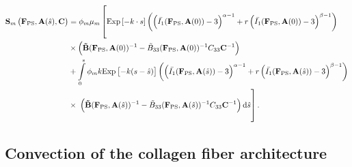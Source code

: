 \begin{equation}
\begin{split}
\mathbf{S}_m \left(\mathbf{F}_\mathrm{PS}, \mathbf{A}(\hat{s}),\mathbf{C}\right) &= \phi_m \mu_m \left[ \vphantom{\int\displaylimits_0^s} \mathrm{Exp}\left[-k  \cdot s\right]  \left(\left( \bar{I_1} (\mathbf{F}_\mathrm{PS}, \mathbf{A}(0)) - 3\right)^{\alpha - 1} + r \left( \bar{I_1} (\mathbf{F}_\mathrm{PS}, \mathbf{A}(0)) - 3\right)^{\beta - 1}\right)  \right.\\
&\times \left( \mathbf{\tilde{B}}(\mathbf{F}_\mathrm{PS}, \mathbf{A}(0))^{-1} - \tilde{B}_{33}(\mathbf{F}_\mathrm{PS}, \mathbf{A}(0))^{-1}C_{33}\mathbf{C}^{-1}\right) \\
&+ \int\displaylimits_0^s \phi_m k  \mathrm{Exp}\left[-k (s - \hat{s})\right] \left(\left( \bar{I_1} (\mathbf{F}_\mathrm{PS}, \mathbf{A}(\hat{s})) - 3\right)^{\alpha - 1} + r \left( \bar{I_1} (\mathbf{F}_\mathrm{PS}, \mathbf{A}(\hat{s})) - 3\right)^{\beta - 1}\right) \\
&\times \left. \vphantom{\int\displaylimits_-^s} \left( \mathbf{\tilde{B}}(\mathbf{F}_\mathrm{PS}, \mathbf{A}(\hat{s}))^{-1} - \tilde{B}_{33}(\mathbf{F}_\mathrm{PS}, \mathbf{A}(\hat{s}))^{-1}C_{33}\mathbf{C}^{-1}\right) \mathrm{d}\hat{s}\right].
\end{split}
\end{equation}

\subsection{Convection of the collagen fiber architecture}
\label{sec:convection}

